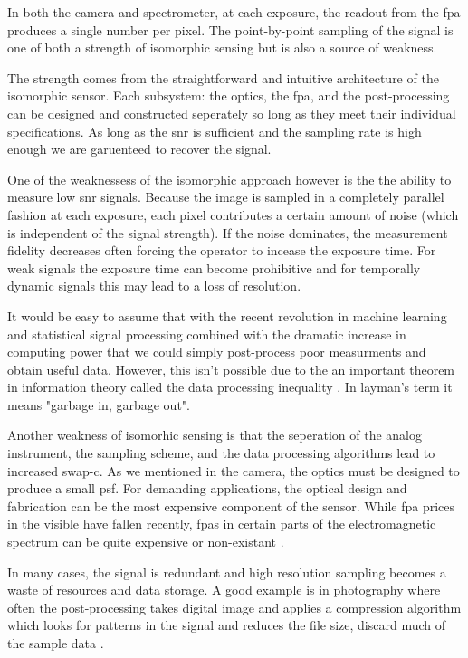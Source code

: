 In both the camera and spectrometer, at each exposure, the readout from the \gls{fpa} produces a single number per pixel. The point-by-point sampling of the signal is one of both a strength of isomorphic sensing but is also a source of weakness. 

The strength comes from the straightforward and intuitive architecture of the isomorphic sensor. Each subsystem: the optics, the \gls{fpa}, and the post-processing can be designed and constructed seperately so long as they meet their individual specifications. As long as the \gls{snr} is sufficient and the sampling rate is high enough we are garuenteed to recover the signal.

One of the weaknessess of the isomorphic approach however is the the ability to measure low \gls{snr} signals. Because the image is sampled in a completely parallel fashion at each exposure, each pixel contributes a certain amount of noise (which is independent of the signal strength). If the noise dominates, the measurement fidelity decreases often forcing the operator to incease the exposure time. For weak signals the exposure time can become prohibitive and for temporally dynamic signals this may lead to a loss of resolution. 

It would be easy to assume that with the recent revolution in machine learning and statistical signal processing combined with the dramatic increase in computing power that we could simply post-process poor measurments and obtain useful data. However, this isn't possible due to the an important theorem in information theory called the data processing inequality \cite{cover2012elements}. In layman's term it means "garbage in, garbage out".

Another weakness of isomorhic sensing is that the seperation of the analog instrument, the sampling scheme, and the data processing algorithms lead to increased \gls{swap-c}. As we mentioned in the camera, the optics must be designed to produce a small \gls{psf}. For demanding applications, the optical design and fabrication can be the most expensive component of the sensor. While \gls{fpa} prices in the visible have fallen recently, \glspl{fpa} in certain parts of the electromagnetic spectrum can be quite expensive or non-existant \cite{noor2011compressive}.

In many cases, the signal is redundant and high resolution sampling becomes a waste of resources and data storage. A good example is in photography where often the post-processing takes digital image and applies a compression algorithm which looks for patterns in the signal and reduces the file size, discard much of the sample data \cite{taubman2012jpeg2000}. 

